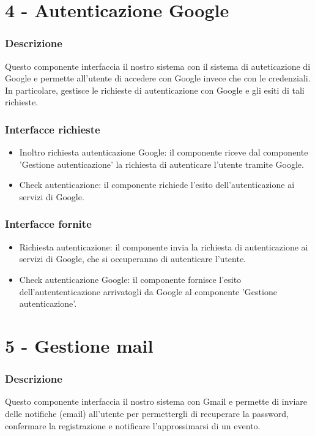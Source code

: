 \documentclass[a4paper,12pt]{article}
\begin{document}
\section*{4 -  Autenticazione  Google}
\subsubsection*{Descrizione}
Questo componente interfaccia il nostro sistema con il sistema di auteticazione di Google e permette all'utente di accedere con Google invece che con le credenziali. In particolare, gestisce le richieste di autenticazione con Google e gli esiti di tali richieste. 
\subsubsection*{Interfacce richieste}
\begin{itemize} \setlength\itemsep{0.01em}
\item {\sffamily Inoltro richiesta autenticazione Google}: il componente riceve dal componente 'Gestione autenticazione' la richiesta di autenticare l'utente tramite Google.
\item {\sffamily Check autenticazione}: il componente richiede l'esito dell'autenticazione ai servizi di Google.

\end{itemize}

\subsubsection*{Interfacce fornite}
\begin{itemize} \setlength\itemsep{0.01em}
\item {\sffamily Richiesta autenticazione}: il componente invia la richiesta di autenticazione ai servizi di Google, che si occuperanno di autenticare l'utente.
\item {\sffamily Check autenticazione Google}: il componente fornisce l'esito dell'autententicazione arrivatogli da Google al componente 'Gestione autenticazione'.
\end{itemize}



\section*{5 -  Gestione mail}
\subsubsection*{Descrizione}
Questo componente interfaccia il nostro sistema con Gmail e permette di inviare delle notifiche (email) all'utente per permettergli di recuperare la password, confermare la registrazione e notificare l'approssimarsi di un evento. 
\end{document}

